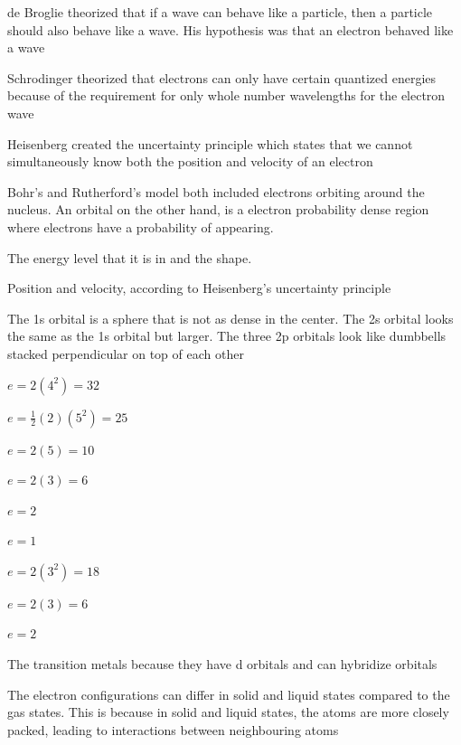 \begin{solutions}
    \item 
    \begin{enum-alph}
        \item de Broglie theorized that if a wave can behave like a particle, then a particle
            should also behave like a wave. His hypothesis was that an electron behaved like a
            wave
        \item Schrodinger theorized that electrons can only have certain quantized energies because
            of the requirement for only whole number wavelengths for the electron wave
        \item Heisenberg created the uncertainty principle which states that we cannot simultaneously
            know both the position and velocity of an electron
    \end{enum-alph}

    \item Bohr's and Rutherford's model both included electrons orbiting around the nucleus. An orbital
    on the other hand, is a electron probability dense region where electrons have a probability
    of appearing.
    \item The energy level that it is in and the shape.
    \item Position and velocity, according to Heisenberg's uncertainty principle
    \item The 1s orbital is a sphere that is not as dense in the center. The 2s orbital looks
        the same as the 1s orbital but larger. The three 2p orbitals look like dumbbells stacked
        perpendicular on top of each other
    \item 
        \begin{enum-alph}
            \item $e=2(4^2)=32$
            \item $e=\frac{1}{2}(2)(5^2)=25$
            \item $e=2(5)=10$
            \item $e=2(3)=6$
            \item $e=2$
            \item $e=1$
            \item $e=2(3^2)=18$
            \item $e=2(3)=6$
            \item $e=2$
        \end{enum-alph}
    \item The transition metals because they have d orbitals and can hybridize orbitals
    \item The electron configurations can differ in solid and liquid states compared to the gas
        states. This is because in solid and liquid states, the atoms are more closely packed,
        leading to interactions between neighbouring atoms
\end{solutions}
